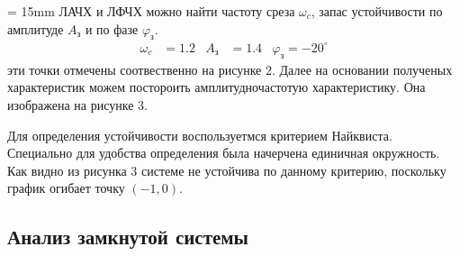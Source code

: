 \documentclass[a4paper, 12pt]{article}
\begin{document}
\noindent
\begin{minipage}[t]{0.6\textwidth}
	\parindent = 15mm
	 ЛАЧХ и ЛФЧХ можно найти частоту среза $\omega_c$, запас устойчивости по амплитуде $A_\text{з}$ и по фазе $\varphi_\text{з}$.
	\begin{align*}
	\omega_c & = 1.2 & A_\text{з} & = 1.4 & \varphi_\text{з} = -20^\circ
	\end{align*}
	 эти точки отмечены соотвественно на рисунке 2. Далее на основании полученых характеристик можем постороить амплитудночастотую характеристику. Она изображена на рисунке 3. \par
	Для определения устойчивости воспользуетмся критерием Найквиста. Специально для удобства определения была начерчена единичная окружность. Как видно из рисунка 3 системе не устойчива по данному критерию, поскольку график огибает точку $(-1, 0)$.
\end{minipage}
\newpage
\begin{center}
	\section{Анализ замкнутой системы}
\end{center}
\end{document}
